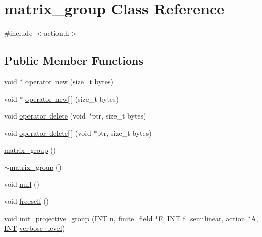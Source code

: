 \hypertarget{classmatrix__group}{}\section{matrix\+\_\+group Class Reference}
\label{classmatrix__group}


{\ttfamily \#include $<$action.\+h$>$}

\subsection*{Public Member Functions}
\begin{DoxyCompactItemize}
\item 
void $\ast$ \mbox{\hyperlink{classmatrix__group_afce7c219d7ced406a3a4923f0bf79f6c}{operator new}} (size\+\_\+t bytes)
\item 
void $\ast$ \mbox{\hyperlink{classmatrix__group_a3be7fdcc5f312d234331a10f01879f33}{operator new\mbox{[}$\,$\mbox{]}}} (size\+\_\+t bytes)
\item 
void \mbox{\hyperlink{classmatrix__group_a63fe7e3b4f74e08529b86d540c9aa362}{operator delete}} (void $\ast$ptr, size\+\_\+t bytes)
\item 
void \mbox{\hyperlink{classmatrix__group_a79e65b4b5abe6916f24e4585dd4477e0}{operator delete\mbox{[}$\,$\mbox{]}}} (void $\ast$ptr, size\+\_\+t bytes)
\item 
\mbox{\hyperlink{classmatrix__group_a1e9188cfe0f75e3ba661eea9c213edf4}{matrix\+\_\+group}} ()
\item 
\mbox{\hyperlink{classmatrix__group_ac6bef4ea37c7992fb97ff8ac0474a4a6}{$\sim$matrix\+\_\+group}} ()
\item 
void \mbox{\hyperlink{classmatrix__group_a88e1af6f805696f62fb0e33d2e29cec8}{null}} ()
\item 
void \mbox{\hyperlink{classmatrix__group_a961d53d2f9c72765f5d357ab4b310381}{freeself}} ()
\item 
void \mbox{\hyperlink{classmatrix__group_a626286de5799c4c9e45216e735b1d233}{init\+\_\+projective\+\_\+group}} (\mbox{\hyperlink{galois_8h_a09fddde158a3a20bd2dcadb609de11dc}{I\+NT}} \mbox{\hyperlink{classmatrix__group_a7fa23c582338a8dd30fce932cc1b950d}{n}}, \mbox{\hyperlink{classfinite__field}{finite\+\_\+field}} $\ast$\mbox{\hyperlink{simeon_8_c_a21a61c535ff7d9d4b674461d3b19fffa}{F}}, \mbox{\hyperlink{galois_8h_a09fddde158a3a20bd2dcadb609de11dc}{I\+NT}} \mbox{\hyperlink{classmatrix__group_a25b03f9f93dcced3aaa256934de3b20c}{f\+\_\+semilinear}}, \mbox{\hyperlink{classaction}{action}} $\ast$\mbox{\hyperlink{simeon_8_c_a97833f04c3a9c008df5521a2fc291bb4}{A}}, \mbox{\hyperlink{galois_8h_a09fddde158a3a20bd2dcadb609de11dc}{I\+NT}} \mbox{\hyperlink{simeon_8_c_a818073fbcc2f439e7c56952f67386122}{verbose\+\_\+level}})

\end{DoxyCompactItemize}
